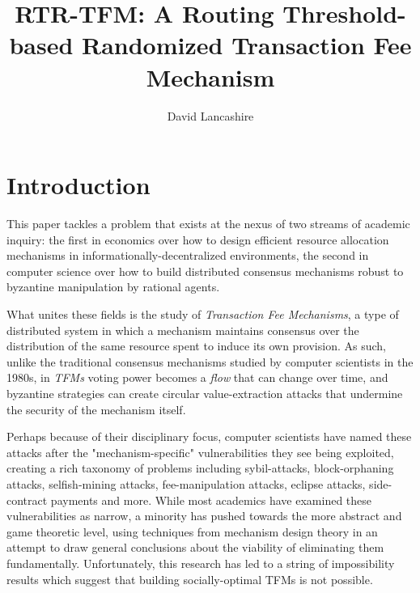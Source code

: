 \documentclass[sigconf,anonymous]{aamas}
\title[Routing Threshold-based Randomized Transaction Fee Mechanism]{RTR-TFM: A Routing Threshold-based Randomized Transaction Fee Mechanism}
\author{David Lancashire}
\affiliation{
  \institution{Proclus Technologies}
  \city{Bangkok}
  \country{Thailand}}
\begin{document}
\pagestyle{fancy}
\fancyhead{}

\maketitle 

\section{Introduction \label{sec::introduction}}

This paper tackles a problem that exists at the nexus of two streams of academic inquiry: the first in economics over how to design efficient resource allocation mechanisms in informationally-decentralized environments, the second in computer science over how to build distributed consensus mechanisms robust to byzantine manipulation by rational agents.

What unites these fields is the study of \emph{Transaction Fee Mechanisms}, a type of distributed system in which a mechanism maintains consensus over the distribution of the same resource spent to induce its own provision. As such, unlike the traditional consensus mechanisms studied by computer scientists in the 1980s, in \textit{TFMs} voting power becomes a \textit{flow} that can change over time, and byzantine strategies can create circular value-extraction attacks that undermine the security of the mechanism itself.

Perhaps because of their disciplinary focus, computer scientists have named these attacks after the "mechanism-specific" vulnerabilities they see being exploited, creating a rich taxonomy of problems including sybil-attacks, block-orphaning attacks, selfish-mining attacks, fee-manipulation attacks, eclipse attacks, side-contract payments and more. While most academics have examined these vulnerabilities as narrow, a minority has pushed towards the more abstract and game theoretic level, using techniques from mechanism design theory in an attempt to draw general conclusions about the viability of eliminating them fundamentally. Unfortunately, this research has led to a string of impossibility results which suggest that building socially-optimal TFMs is not possible.
\end{document}
